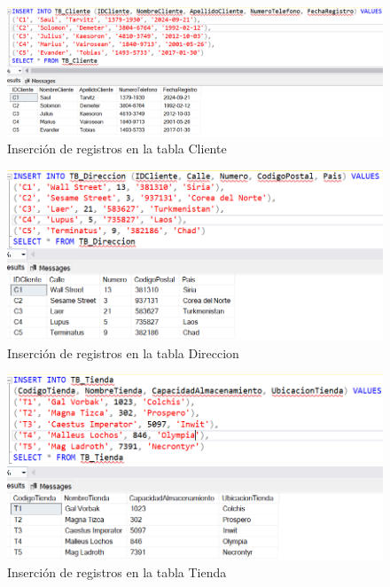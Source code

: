 \begin{figure}[H]
  \centering
  \includegraphics[scale = 0.5]{Imagenes/sql/3.insertar_registros/insertar_registros_cliente.png}
  \caption{Inserción de registros en la tabla Cliente}
\end{figure}

\begin{figure}[H]
  \centering
  \includegraphics[scale = 0.5]{Imagenes/sql/3.insertar_registros/insertar_registros_direccion.png}
  \caption{Inserción de registros en la tabla Direccion}
\end{figure}

\begin{figure}[H]
  \centering
  \includegraphics[scale = 0.5]{Imagenes/sql/3.insertar_registros/insertar_registros_tienda.png}
  \caption{Inserción de registros en la tabla Tienda}
\end{figure}


